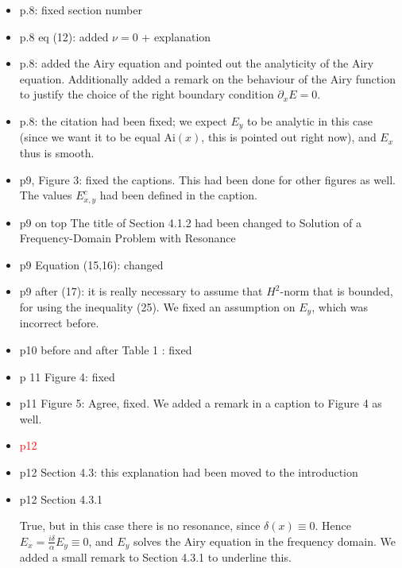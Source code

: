\documentclass[a4paper,10pt]{article}
\begin{document}
\begin{itemize}
 \item p.8: fixed section number
 
 \item p.8 eq (12): added $\nu=0$ + explanation
 
 \item p.8: added the Airy equation and pointed out the analyticity of the Airy equation. Additionally added a remark on the behaviour of the Airy function to justify the choice of the right boundary 
 condition $\partial_x E=0$. 
 
 \item p.8: the citation had been fixed; we expect $E_y$ to be analytic in this case (since we want it to be equal $\mathrm{Ai}(x)$, this is pointed out right now), 
 and $E_x$ thus is smooth.
 
 \item  p9, Figure 3: fixed the captions. This had been done for other figures as well. The values $E^{c}_{x,y}$ had been defined in the caption.
 
 \item p9 on top
  The title of Section 4.1.2 had been changed to Solution of a Frequency-Domain Problem with Resonance
  
 \item p9 Equation (15,16): changed  

 \item p9 after (17): it is really necessary to assume that $H^2$-norm that is bounded, for using the inequality (25). 
 We fixed an assumption on $E_y$, which was incorrect before.


  
 \item p10 before and after Table 1 : fixed
 
 \item p 11 Figure 4: fixed
 
 \item p11 Figure 5:
Agree, fixed. We added a remark in a caption to Figure 4 as well.


\item {\textcolor{red}{p12}}


\item p12 Section 4.3: this explanation had been moved to the introduction



\item p12 Section 4.3.1

  True, but in this case there is no resonance, since $\delta(x)\equiv 0$. Hence $E_x=\frac{i\delta}{\alpha}E_y\equiv 0$, 
  and $E_y$ solves the Airy equation in the frequency domain. We added a small remark to Section 4.3.1 to underline this. 


\end{itemize}
\end{document}
